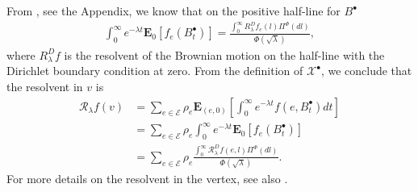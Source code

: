 \documentclass[11pt,a4paper]{article}
\newcommand{\redbf}[1]{\textbf{\textcolor{red}{#1}}}
\theoremstyle{plain}
\theoremstyle{definition}
\theoremstyle{remark}
\begin{document}
		From  \cite[Formula 6, Section 15]{ito1963brownian}, see the Appendix, we know that on the positive half-line for \(B^\bullet\)
		\begin{align*}
			\int_0^\infty e^{-\lambda t} \mathbf{E}_0[f_e(B^\bullet_t)]= \frac{\int_0^\infty {R}_\lambda^D f_e(l) \Pi^\Phi(dl)}{\Phi(\sqrt{\lambda})},
		\end{align*}
		where \({R}_\lambda^D f\) is the resolvent of the Brownian motion on the half-line with the Dirichlet boundary condition at zero. From the definition of \(\mathcal{X}^\bullet\), we conclude that the resolvent in \(v\) is
		\begin{align*}
			\mathcal{R}_\lambda f(v)&= \sum_{e \in \mathcal{E}} \rho_e \mathbf{E}_{(e,0)}  \left[\int_0^\infty e^{-\lambda t} f(e, B^\bullet_t) dt\right]\\&=\sum_{e \in \mathcal{E}} \rho_e \int_0^\infty e^{-\lambda t} \mathbf{E}_0[f_e(B^\bullet_t)]\\&= \sum_{e \in \mathcal{E}} \rho_e \frac{\int_0^\infty \mathcal{R}_\lambda^D f(e, l) \Pi^\Phi(dl)}{\Phi(\sqrt{\lambda})}.
		\end{align*}
		For more details on the resolvent in the vertex, see also \cite[Section 21.11]{werner2016brownian}.
		
		
\end{document}
